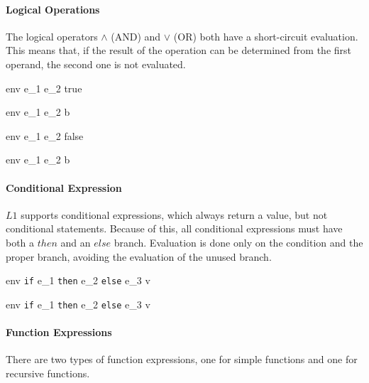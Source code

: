 \documentclass{article}
\begin{document}
\paragraph{Logical Operations}
The logical operators $\wedge$ (AND) and $\vee$ (OR) both have a short-circuit evaluation.
This means that, if the result of the operation can be determined from the first operand, the second one is not evaluated.

    {\mbox{env} \vdash e_1 \vee e_2 \Downarrow true}

    {\mbox{env} \vdash e_1 \vee e_2 \Downarrow b}

    {\mbox{env} \vdash e_1 \wedge e_2 \Downarrow false}

    {\mbox{env} \vdash e_1 \wedge e_2 \Downarrow b}

\paragraph{Conditional Expression}
$L1$ supports conditional expressions, which always return a value, but not conditional statements.
Because of this, all conditional expressions must have both a $then$ and an $else$ branch.
Evaluation is done only on the condition and the proper branch, avoiding the evaluation of the unused branch.

    {\mbox{env} \vdash \texttt{if} \; e_1\; \texttt{then} \; e_2 \; \texttt{else} \; e_3 \Downarrow v}

    {\mbox{env} \vdash \texttt{if} \; e_1\; \texttt{then} \; e_2 \; \texttt{else} \; e_3 \Downarrow v}

\paragraph{Function Expressions}

There are two types of function expressions, one for simple functions and one for recursive functions.
\end{document}
